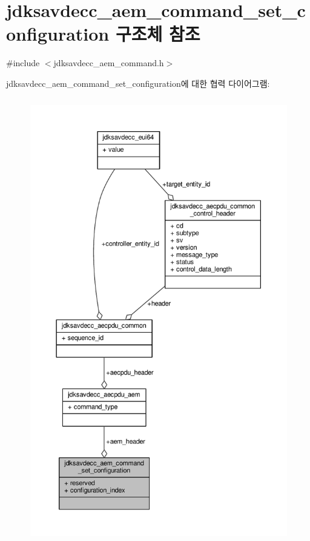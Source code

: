 \hypertarget{structjdksavdecc__aem__command__set__configuration}{}\section{jdksavdecc\+\_\+aem\+\_\+command\+\_\+set\+\_\+configuration 구조체 참조}
\label{structjdksavdecc__aem__command__set__configuration}


{\ttfamily \#include $<$jdksavdecc\+\_\+aem\+\_\+command.\+h$>$}



jdksavdecc\+\_\+aem\+\_\+command\+\_\+set\+\_\+configuration에 대한 협력 다이어그램\+:
\nopagebreak
\begin{figure}[H]
\begin{center}
\leavevmode
\includegraphics[height=550pt]{structjdksavdecc__aem__command__set__configuration__coll__graph}
\end{center}
\end{figure}
